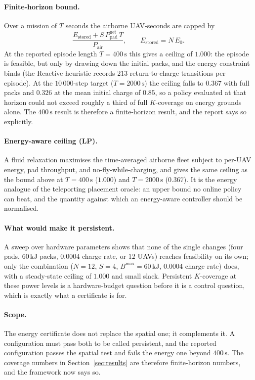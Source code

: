 \documentclass[conference]{IEEEtran}
\newcommand{\tokReactRet}{213}
\begin{document}
\paragraph{Finite-horizon bound.}  Over a mission of $T$ seconds the
airborne UAV-seconds are capped by
\[
\frac{E_{\mathrm{stored}} + S\,P_{\mathrm{pad}}^{\mathrm{net}}\,T}{P_{\mathrm{air}}},
\qquad
E_{\mathrm{stored}} = N\,E_0 .
\]
At the reported episode length $T=400\,\mathrm{s}$ this gives a ceiling of
$1.000$: the episode is feasible, but only by drawing down the initial
packs, and the energy constraint binds (the Reactive heuristic records
$\tokReactRet$ return-to-charge transitions per episode).  At the
$10\,000$-step target ($T=2000\,\mathrm{s}$) the ceiling falls to
$0.367$ with full packs and $0.326$ at the mean initial charge of $0.85$,
so a policy evaluated at that horizon could not exceed roughly a third of
full $K$-coverage on energy grounds alone.  The $400\,\mathrm{s}$ result
is therefore a finite-horizon result, and the report says so explicitly.

\paragraph{Energy-aware ceiling (LP).}  A fluid relaxation maximises the
time-averaged airborne fleet subject to per-UAV energy, pad throughput, and
no-fly-while-charging, and gives the same ceiling as the bound above at
$T=400\,\mathrm{s}$ ($1.000$) and $T=2000\,\mathrm{s}$ ($0.367$).  It is
the energy analogue of the teleporting placement oracle: an upper bound no
online policy can beat, and the quantity against which an energy-aware
controller should be normalised.

\paragraph{What would make it persistent.}  A sweep over hardware parameters
shows that none of the single changes (four pads, $60\,\mathrm{kJ}$ packs,
$0.0004$ charge rate, or $12$ UAVs) reaches feasibility on its own; only
the combination ($N=12$, $S=4$, $B^{\max}=60\,\mathrm{kJ}$,
$0.0004$ charge rate) does, with a steady-state ceiling of $1.000$ and
small slack.  Persistent $K$-coverage at these power levels is a
hardware-budget question before it is a control question, which is exactly
what a certificate is for.

\paragraph{Scope.}  The energy certificate does not replace the spatial one;
it complements it.  A configuration must pass both to be called persistent,
and the reported configuration passes the spatial test and fails the energy
one beyond $400\,\mathrm{s}$.  The coverage numbers in Section~\ref{sec:results}
are therefore finite-horizon numbers, and the framework now says so.
\end{document}
